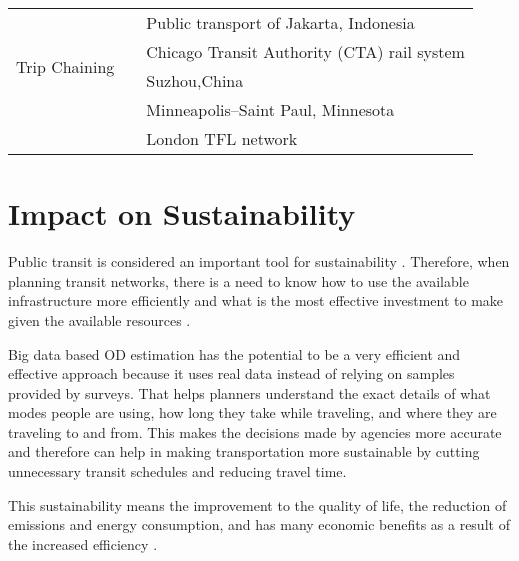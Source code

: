 \documentclass[11pt,twoside]{article}
\numberwithin{equation}{section}
\newcommand{\?}{\stackrel{?}{=}}
\begin{document}
\begin{longtable}[c]{l|l|l}
      \midrule


      \multirow{4}{*}{Trip Chaining}  & \citep{widyawanBigDataAnalytic2017} & Public transport of Jakarta, Indonesia\\
      & \citep{zhaoEstimatingRailPassenger2007} & Chicago Transit Authority (CTA) rail system\\
      & \citep{huangMethodBusOD2020}& Suzhou,China\\
      & \citep{nassirTransitStopLevelOrigin2011} & Minneapolis–Saint Paul, Minnesota\\
      & \citep{wangBusPassengerOrigindestination2010} & London TFL network\\









  \bottomrule
\end{longtable}





\section{Impact on Sustainability}
Public transit is considered an important tool for sustainability \citep{miller2016analyzing}. Therefore, when planning transit networks, there is a need to know how to use the available infrastructure more efficiently and what is the most effective investment to make given the available resources \citep{peterson2007origindestination}.

Big data based OD estimation has the potential to be a very efficient and effective approach because it uses real data instead of relying on samples provided by surveys. That helps planners understand the exact details of what modes people are using, how long they take while traveling, and where they are traveling to and from. This makes the decisions made by agencies more accurate and therefore can help in making transportation more sustainable by cutting unnecessary transit schedules and reducing travel time.

This sustainability means the improvement to the quality of life, the reduction of emissions and energy consumption, and has many economic benefits as a result of the increased efficiency \citep{henke2020decisionmaking}.
\end{document}
